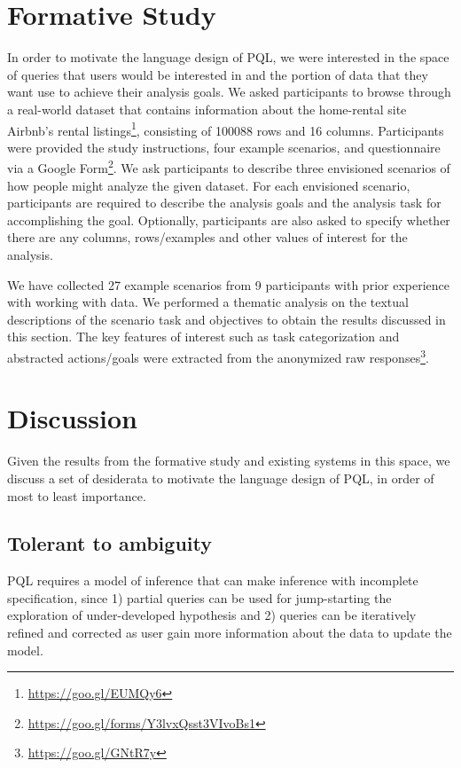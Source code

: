 \documentclass{sig-alternate-05-2015}
\begin{document}
\section{Formative Study}
\par In order to motivate the language design of PQL, we were interested in the space of queries that users would be interested in and the portion of data that they want use to achieve their analysis goals. We asked participants to browse through a real-world dataset that contains information about the home-rental site Airbnb's rental listings\footnote{\url{https://goo.gl/EUMQy6}}, consisting of 100088 rows and 16 columns. Participants were provided the study instructions, four example scenarios, and questionnaire via a Google Form\footnote{\url{https://goo.gl/forms/Y3lvxQsst3VIvoBs1}}. We ask participants to describe three envisioned scenarios of how people might analyze the given dataset. For each envisioned scenario, participants are required to describe the analysis goals and the analysis task for accomplishing the goal. Optionally, participants are also asked to specify whether there are any columns, rows/examples and other values of interest for the analysis. 
\par We have collected 27 example scenarios from 9 participants with prior experience with working with data. We performed a thematic analysis on the textual descriptions of the scenario task and objectives to obtain the results discussed in this section. The key features of interest such as task categorization and abstracted actions/goals were extracted from the anonymized raw responses\footnote{\url{https://goo.gl/GNtR7y}}.
\section{Discussion}
Given the results from the formative study and existing systems in this space, we discuss a set of desiderata to motivate the language design of PQL, in order of most to least importance.
\subsection{Tolerant to ambiguity} 
PQL requires a model of inference that can make inference with incomplete specification, since 1) partial queries can be used for jump-starting the exploration of under-developed hypothesis and 2) queries can be iteratively refined and corrected as user gain more information about the data to update the model. 
\end{document}
